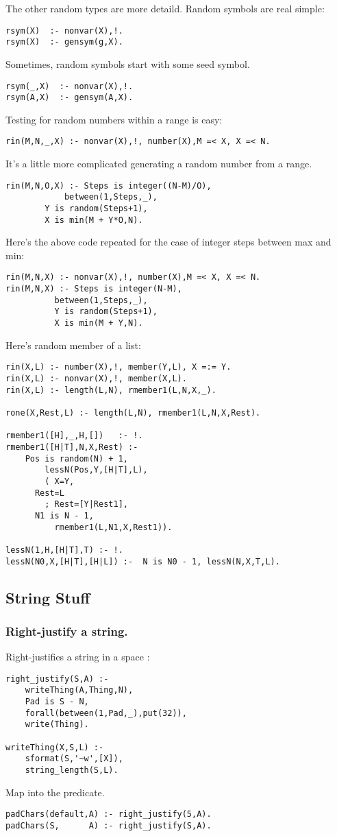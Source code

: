 The other random types are
more detaild. Random symbols are real simple:
\begin{Verbatim}
rsym(X)  :- nonvar(X),!.
rsym(X)  :- gensym(g,X).
\end{Verbatim}
Sometimes, random symbols start with
some seed symbol.
\begin{Verbatim}
rsym(_,X)  :- nonvar(X),!.
rsym(A,X)  :- gensym(A,X).
\end{Verbatim}
Testing for  random numbers within a range is easy:
\begin{Verbatim}
rin(M,N,_,X) :- nonvar(X),!, number(X),M =< X, X =< N.
\end{Verbatim}
It's a little more complicated generating a random
number from a range. 
\begin{Verbatim}
rin(M,N,O,X) :- Steps is integer((N-M)/O),
	        between(1,Steps,_),
		Y is random(Steps+1),
		X is min(M + Y*O,N).
\end{Verbatim}
Here's the above code repeated for the case of
integer steps between max and min:
\begin{Verbatim}
rin(M,N,X) :- nonvar(X),!, number(X),M =< X, X =< N.
rin(M,N,X) :- Steps is integer(N-M),
	      between(1,Steps,_),
	      Y is random(Steps+1),
	      X is min(M + Y,N).
\end{Verbatim}
Here's random member of a list:
\begin{Verbatim}
rin(X,L) :- number(X),!, member(Y,L), X =:= Y.
rin(X,L) :- nonvar(X),!, member(X,L).
rin(X,L) :- length(L,N), rmember1(L,N,X,_).

rone(X,Rest,L) :- length(L,N), rmember1(L,N,X,Rest).

rmember1([H],_,H,[])   :- !.
rmember1([H|T],N,X,Rest) :-
	Pos is random(N) + 1,
        lessN(Pos,Y,[H|T],L),
        ( X=Y,
	  Rest=L
        ; Rest=[Y|Rest1],
	  N1 is N - 1,
          rmember1(L,N1,X,Rest1)).

lessN(1,H,[H|T],T) :- !.
lessN(N0,X,[H|T],[H|L]) :-  N is N0 - 1, lessN(N,X,T,L).
\end{Verbatim}
\subsection{ String Stuff
}
\label{sec:strings}
\subsubsection{ Right-justify a string.
}
Right-justifies a string  in a space 
: 
\begin{Verbatim}
right_justify(S,A) :-
    writeThing(A,Thing,N),
    Pad is S - N,
    forall(between(1,Pad,_),put(32)),
    write(Thing).

writeThing(X,S,L) :- 
    sformat(S,'~w',[X]), 
    string_length(S,L).
\end{Verbatim}
Map  into the 
predicate.
\begin{Verbatim}
padChars(default,A) :- right_justify(5,A).
padChars(S,      A) :- right_justify(S,A).   
\end{Verbatim}  
